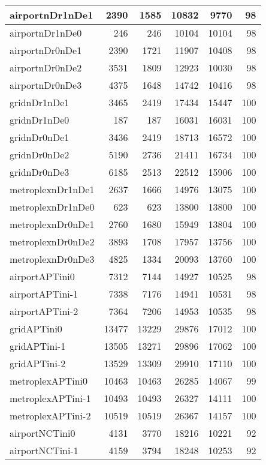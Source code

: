 \begin{longtable}{|l|r|r|r|r|r|}
\endlastfoot
airportnDr1nDe1 & 2390 & 1585 & 10832 & 9770 & 98 \\ \hline
airportnDr1nDe0 & 246 & 246 & 10104 & 10104 & 98 \\ \hline
airportnDr0nDe1 & 2390 & 1721 & 11907 & 10408 & 98 \\ \hline
airportnDr0nDe2 & 3531 & 1809 & 12923 & 10030 & 98 \\ \hline
airportnDr0nDe3 & 4375 & 1648 & 14742 & 10416 & 98 \\ \hline
gridnDr1nDe1 & 3465 & 2419 & 17434 & 15447 & 100 \\ \hline
gridnDr1nDe0 & 187 & 187 & 16031 & 16031 & 100 \\ \hline
gridnDr0nDe1 & 3436 & 2419 & 18713 & 16572 & 100 \\ \hline
gridnDr0nDe2 & 5190 & 2736 & 21411 & 16734 & 100 \\ \hline
gridnDr0nDe3 & 6185 & 2513 & 22512 & 15906 & 100 \\ \hline
metroplexnDr1nDe1 & 2637 & 1666 & 14976 & 13075 & 100 \\ \hline
metroplexnDr1nDe0 & 623 & 623 & 13800 & 13800 & 100 \\ \hline
metroplexnDr0nDe1 & 2760 & 1680 & 15949 & 13804 & 100 \\ \hline
metroplexnDr0nDe2 & 3893 & 1708 & 17957 & 13756 & 100 \\ \hline
metroplexnDr0nDe3 & 4825 & 1334 & 20093 & 13760 & 100 \\ \hline
airportAPTini0 & 7312 & 7144 & 14927 & 10525 & 98 \\ \hline
airportAPTini-1 & 7338 & 7176 & 14941 & 10531 & 98 \\ \hline
airportAPTini-2 & 7364 & 7206 & 14953 & 10535 & 98 \\ \hline
gridAPTini0 & 13477 & 13229 & 29876 & 17012 & 100 \\ \hline
gridAPTini-1 & 13505 & 13271 & 29896 & 17062 & 100 \\ \hline
gridAPTini-2 & 13529 & 13309 & 29910 & 17110 & 100 \\ \hline
metroplexAPTini0 & 10463 & 10463 & 26285 & 14067 & 99 \\ \hline
metroplexAPTini-1 & 10493 & 10493 & 26327 & 14111 & 100 \\ \hline
metroplexAPTini-2 & 10519 & 10519 & 26367 & 14157 & 100 \\ \hline
airportNCTini0 & 4131 & 3770 & 18216 & 10221 & 92 \\ \hline
airportNCTini-1 & 4159 & 3794 & 18248 & 10253 & 92 \\ \hline

\end{longtable}
